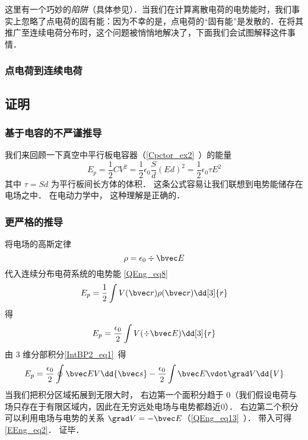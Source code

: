 这里有一个巧妙的\textsl{陷阱}（具体参见\cite{GriffE}）．当我们在计算离散电荷的电势能时，我们事实上忽略了点电荷的固有能：因为不幸的是，点电荷的“固有能”是发散的．在将其推广至连续电荷分布时，这个问题被悄悄地解决了，下面我们会试图解释这件事情．
\subsubsection{点电荷到连续电荷}


\subsection{证明}

\subsubsection{基于电容的不严谨推导}
我们来回顾一下真空中平行板电容器（\autoref{Cpctor_ex2}~）的能量
\begin{equation}
E_p = \frac12 CV^2 = \frac12 \epsilon_0 \frac Sd (Ed)^2 = \frac 12 \epsilon_0 \tau E^2
\end{equation}
其中 $\tau = Sd$ 为平行板间长方体的体积． 这条公式容易让我们联想到电势能储存在电场之中． 在电动力学中， 这种理解是正确的．

\subsubsection{更严格的推导}

将电场的高斯定律
\begin{equation}
\rho = \epsilon_0\div \bvec E
\end{equation}
代入连续分布电荷系统的电势能 \autoref{QEng_eq8}~
\begin{equation}
E_p = \frac 12 \int V(\bvec r) \rho(\bvec r) \dd[3]{r}
\end{equation}
得
\begin{equation}
E_p = \frac{\epsilon_0}2 \int V (\div \bvec E) \dd[3]{r}
\end{equation}
由 3 维分部积分\autoref{IntBP2_eq1}~得
\begin{equation}
E_p = \frac{\epsilon_0}2 \oint \bvec E V \dd{\bvec s} - \frac{\epsilon_0}{2} \int \bvec E \vdot \grad V \dd{V}
\end{equation}
当我们把积分区域拓展到无限大时， 右边第一个面积分趋于 0（我们假设电荷与场只存在于有限区域内，因此在无穷远处电场与电势都趋近$0$）． 右边第二个积分可以利用电场与电势的关系 $\grad V = -\bvec E$（\autoref{QEng_eq13}~）． 带入可得\autoref{EEng_eq2}． 证毕．
